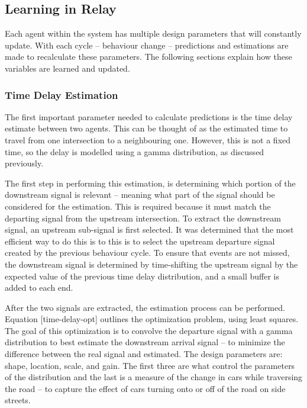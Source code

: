 \documentclass{report}
\begin{document}
\subsection{Learning in Relay}
\label{sec:learning_in_relay}

Each agent within the system has multiple design parameters that will constantly update. With each cycle -- behaviour change -- predictions and estimations are made to recalculate these parameters. 
The following sections explain how these variables are learned and updated.

\subsubsection{Time Delay Estimation}

The first important parameter needed to calculate predictions is the time delay estimate between two agents. 
This can be thought of as the estimated time to travel from one intersection to a neighbouring one. 
However, this is not a fixed time, so the delay is modelled using a gamma distribution, as discussed previously. 

The first step in performing this estimation, is determining which portion of the downstream signal is relevant – meaning what part of the signal should be considered for the estimation. 
This is required because it must match the departing signal from the upstream intersection. 
To extract the downstream signal, an upstream sub-signal is first selected. It was determined that the most efficient way to do this is to this is to select the upstream departure signal created by the previous behaviour cycle. 
To ensure that events are not missed, the downstream signal is determined by time-shifting the upstream signal by the expected value of the previous time delay distribution, and a small buffer is added to each end.

After the two signals are extracted, the estimation process can be performed. 
Equation [time-delay-opt] outlines the optimization problem, using least squares. 
The goal of this optimization is to convolve the departure signal with a gamma distribution to best estimate the downstream arrival signal -- to minimize the difference between the real signal and estimated. 
The design parameters are: shape, location, scale, and gain. 
The first three are what control the parameters of the distribution and the last is a measure of the change in cars while traversing the road -- to capture the effect of cars turning onto or off of the road on side streets.
\end{document}
